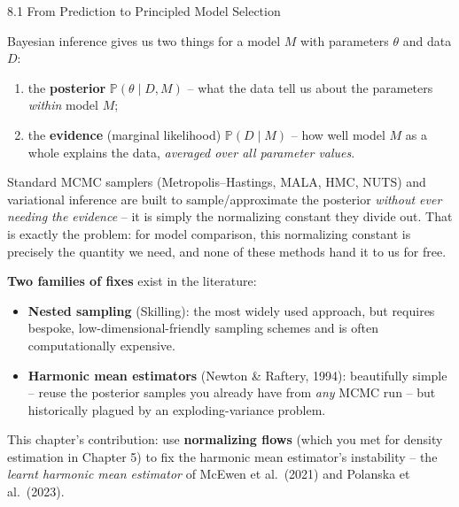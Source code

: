 \documentclass[aspectratio=169,10pt]{beamer}
\begin{document}
\begin{frame}[allowframebreaks]{8.1 From Prediction to Principled Model Selection}

Bayesian inference gives us two things for a model $M$ with parameters $\theta$ and data $D$:
\begin{enumerate}
  \item the \textbf{posterior} $\mathbb{P}(\theta \mid D, M)$ -- what the data tell us about the parameters \emph{within} model $M$;
  \item the \textbf{evidence} (marginal likelihood) $\mathbb{P}(D \mid M)$ -- how well model $M$ as a whole explains the data, \emph{averaged over all parameter values}.
\end{enumerate}

Standard MCMC samplers (Metropolis--Hastings, MALA, HMC, NUTS) and variational inference are built to sample/approximate the posterior \emph{without ever needing the evidence} -- it is simply the normalizing constant they divide out. That is exactly the problem: for model comparison, this normalizing constant is precisely the quantity we need, and none of these methods hand it to us for free.

\framebreak

\textbf{Two families of fixes} exist in the literature:
\begin{itemize}
  \item \textbf{Nested sampling} (Skilling): the most widely used approach, but requires bespoke, low-dimensional-friendly sampling schemes and is often computationally expensive.
  \item \textbf{Harmonic mean estimators} (Newton \& Raftery, 1994): beautifully simple -- reuse the posterior samples you already have from \emph{any} MCMC run -- but historically plagued by an exploding-variance problem.
\end{itemize}

This chapter's contribution: use \textbf{normalizing flows} (which you met for density estimation in Chapter 5) to fix the harmonic mean estimator's instability -- the \emph{learnt harmonic mean estimator} of McEwen et al.\ (2021) and Polanska et al.\ (2023).

\end{frame}
\end{document}
